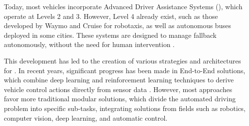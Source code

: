 
Today, most vehicles incorporate Advanced Driver Assistance Systems (), which operate at  Levels 2 and 3. However, Level 4  already exist, such as those developed by Waymo and Cruise for robotaxis, as well as autonomous buses deployed in some cities. These systems are designed to manage fallback autonomously, without the need for human intervention \cite{fallback_strategy}.


This development has led to the creation of various strategies and architectures for . In recent years, significant progress has been made in \mbox{End-to-End} solutions, which combine deep learning and reinforcement learning techniques to derive vehicle control actions directly from sensor data \cite{end_to_end_driving}. However, most approaches favor more traditional modular solutions, which divide the automated driving problem into specific \mbox{sub-tasks}, integrating solutions from fields such as robotics, computer vision, deep learning, and automatic control.

